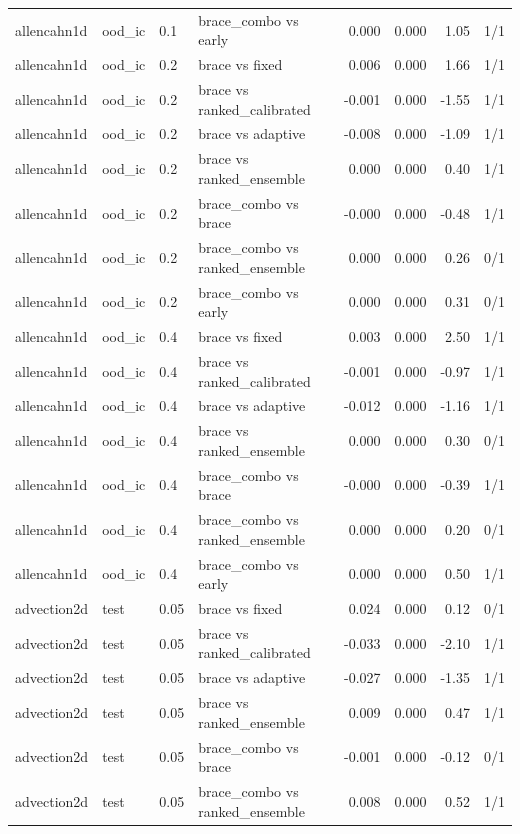 \begin{tabular}{llllrrrr}
allencahn1d & ood\_ic & 0.1 & brace\_combo vs early & 0.000 & 0.000 & 1.05 & 1/1 \\
allencahn1d & ood\_ic & 0.2 & brace vs fixed & 0.006 & 0.000 & 1.66 & 1/1 \\
allencahn1d & ood\_ic & 0.2 & brace vs ranked\_calibrated & -0.001 & 0.000 & -1.55 & 1/1 \\
allencahn1d & ood\_ic & 0.2 & brace vs adaptive & -0.008 & 0.000 & -1.09 & 1/1 \\
allencahn1d & ood\_ic & 0.2 & brace vs ranked\_ensemble & 0.000 & 0.000 & 0.40 & 1/1 \\
allencahn1d & ood\_ic & 0.2 & brace\_combo vs brace & -0.000 & 0.000 & -0.48 & 1/1 \\
allencahn1d & ood\_ic & 0.2 & brace\_combo vs ranked\_ensemble & 0.000 & 0.000 & 0.26 & 0/1 \\
allencahn1d & ood\_ic & 0.2 & brace\_combo vs early & 0.000 & 0.000 & 0.31 & 0/1 \\
allencahn1d & ood\_ic & 0.4 & brace vs fixed & 0.003 & 0.000 & 2.50 & 1/1 \\
allencahn1d & ood\_ic & 0.4 & brace vs ranked\_calibrated & -0.001 & 0.000 & -0.97 & 1/1 \\
allencahn1d & ood\_ic & 0.4 & brace vs adaptive & -0.012 & 0.000 & -1.16 & 1/1 \\
allencahn1d & ood\_ic & 0.4 & brace vs ranked\_ensemble & 0.000 & 0.000 & 0.30 & 0/1 \\
allencahn1d & ood\_ic & 0.4 & brace\_combo vs brace & -0.000 & 0.000 & -0.39 & 1/1 \\
allencahn1d & ood\_ic & 0.4 & brace\_combo vs ranked\_ensemble & 0.000 & 0.000 & 0.20 & 0/1 \\
allencahn1d & ood\_ic & 0.4 & brace\_combo vs early & 0.000 & 0.000 & 0.50 & 1/1 \\
advection2d & test & 0.05 & brace vs fixed & 0.024 & 0.000 & 0.12 & 0/1 \\
advection2d & test & 0.05 & brace vs ranked\_calibrated & -0.033 & 0.000 & -2.10 & 1/1 \\
advection2d & test & 0.05 & brace vs adaptive & -0.027 & 0.000 & -1.35 & 1/1 \\
advection2d & test & 0.05 & brace vs ranked\_ensemble & 0.009 & 0.000 & 0.47 & 1/1 \\
advection2d & test & 0.05 & brace\_combo vs brace & -0.001 & 0.000 & -0.12 & 0/1 \\
advection2d & test & 0.05 & brace\_combo vs ranked\_ensemble & 0.008 & 0.000 & 0.52 & 1/1 \\

\end{tabular}
